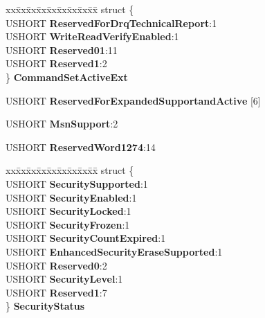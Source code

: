 \begin{DoxyCompactItemize}
\begin{tabbing}
\end{tabbing}\item 
\mbox{\label{struct___i_d_e_n_t_i_f_y___d_e_v_i_c_e___d_a_t_a_a2dcc8ab46f882da78793776be905c88e}} 
\begin{tabbing}
xx\=xx\=xx\=xx\=xx\=xx\=xx\=xx\=xx\=\kill
struct \{\\
\>USHORT {\bfseries ReservedForDrqTechnicalReport}:1\\
\>USHORT {\bfseries WriteReadVerifyEnabled}:1\\
\>USHORT {\bfseries Reserved01}:11\\
\>USHORT {\bfseries Reserved1}:2\\
\} {\bfseries CommandSetActiveExt}\\

\end{tabbing}\item 
\mbox{\label{struct___i_d_e_n_t_i_f_y___d_e_v_i_c_e___d_a_t_a_ab60093f37d35835038828ac3c0a59e6c}} 
U\+S\+H\+O\+RT {\bfseries Reserved\+For\+Expanded\+Supportand\+Active} \mbox{[}6\mbox{]}
\item 
\mbox{\label{struct___i_d_e_n_t_i_f_y___d_e_v_i_c_e___d_a_t_a_a3ac2d129922bf80cde5c30289b8a3636}} 
U\+S\+H\+O\+RT {\bfseries Msn\+Support}\+:2
\item 
\mbox{\label{struct___i_d_e_n_t_i_f_y___d_e_v_i_c_e___d_a_t_a_a73376f18ad324ed47a4906e66f0a5780}} 
U\+S\+H\+O\+RT {\bfseries Reserved\+Word1274}\+:14
\item 
\mbox{\label{struct___i_d_e_n_t_i_f_y___d_e_v_i_c_e___d_a_t_a_a44e6f7e2c856b77c9e9f21ad2622142e}} 
\begin{tabbing}
xx\=xx\=xx\=xx\=xx\=xx\=xx\=xx\=xx\=\kill
struct \{\\
\>USHORT {\bfseries SecuritySupported}:1\\
\>USHORT {\bfseries SecurityEnabled}:1\\
\>USHORT {\bfseries SecurityLocked}:1\\
\>USHORT {\bfseries SecurityFrozen}:1\\
\>USHORT {\bfseries SecurityCountExpired}:1\\
\>USHORT {\bfseries EnhancedSecurityEraseSupported}:1\\
\>USHORT {\bfseries Reserved0}:2\\
\>USHORT {\bfseries SecurityLevel}:1\\
\>USHORT {\bfseries Reserved1}:7\\
\} {\bfseries SecurityStatus}\\


\end{tabbing}
\end{DoxyCompactItemize}
